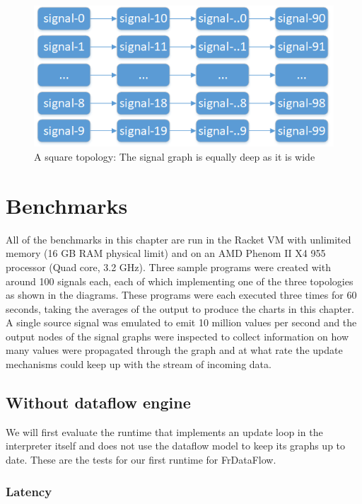 \begin{figure}[h]
	\centerline{\includegraphics[scale=0.7]{images/Evaluation-Topologies-Square.png}}
	\caption{A square topology: The signal graph is equally deep as it is wide}
	\label{fig:evaluation-topologies-square}
\end{figure}

\section{Benchmarks}

All of the benchmarks in this chapter are run in the Racket VM with unlimited memory (16 GB RAM physical limit) and on an AMD Phenom II X4 955 processor (Quad core, 3.2 GHz). Three sample programs were created with around 100 signals each, each of which implementing one of the three topologies as shown in the diagrams. These programs were each executed three times for 60 seconds, taking the averages of the output to produce the charts in this chapter.
A single source signal was emulated to emit 10 million values per second and the output nodes of the signal graphs were inspected to collect information on how many values were propagated through the graph and at what rate the update mechanisms could keep up with the stream of incoming data. 

\newpage
\subsection{Without dataflow engine}

We will first evaluate the runtime that implements an update loop in the interpreter itself and does not use the dataflow model to keep its graphs up to date. These are the tests for our first runtime for FrDataFlow. 

\subsubsection{Latency}

